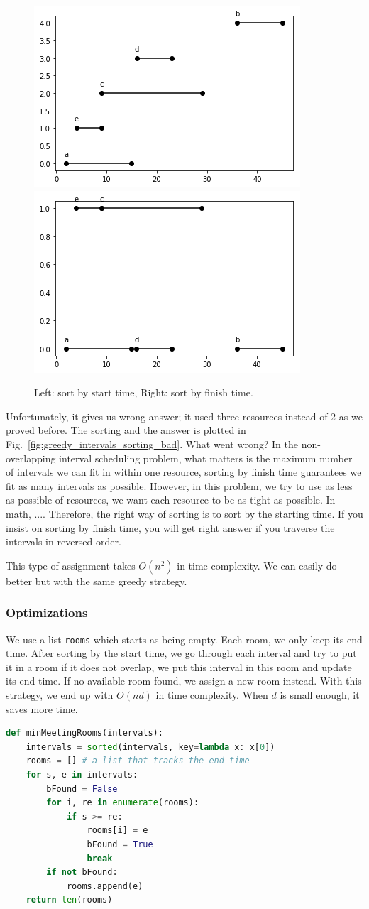 \documentclass[../main.tex]{subfiles}
\begin{document}
\begin{figure}[H]
    \centering
    \includegraphics[width=0.48\columnwidth]{fig/greedy_schedule_all_intervals_sorting.png}
        \includegraphics[width=0.48\columnwidth]{fig/greedy_schedule_all_intervals_good_sort.png}
    \caption{Left: sort by start time, Right: sort by finish time.}
    \label{fig:greedy_intervals_sorting_good}
\end{figure}
Unfortunately, it gives us wrong answer; it used three resources instead of 2 as we proved before. The sorting and the answer is plotted in  Fig.~\ref{fig:greedy_intervals_sorting_bad}. What went wrong? In the non-overlapping interval scheduling problem, what matters is the maximum number of intervals we can fit in within one resource, sorting by finish time guarantees we fit as many intervals as possible. However, in this problem, we try to use as less as possible of resources, we want each resource to be as tight as possible. In math, .... Therefore, the right way of sorting is to sort by the starting time. If you insist on sorting by finish time, you will get right answer if you traverse the intervals in reversed order.  

This type of assignment takes $O(n^2)$ in time complexity. We can easily do better but with the same greedy strategy. 
\subsubsection{Optimizations} 
We use a list \texttt{rooms} which starts as being empty.  Each room, we only keep its end time. After sorting by the start time, we go through each interval and try to put it in a room if it does not overlap, we put this interval in this room and update its end time. If no available room found, we assign a new room instead. With this strategy, we end up with $O(nd)$ in time complexity. When $d$ is small enough, it saves more time. 
\begin{lstlisting}[language=Python]
def minMeetingRooms(intervals):
    intervals = sorted(intervals, key=lambda x: x[0])
    rooms = [] # a list that tracks the end time
    for s, e in intervals:
        bFound = False
        for i, re in enumerate(rooms):
            if s >= re:
                rooms[i] = e
                bFound = True
                break
        if not bFound:
            rooms.append(e)
    return len(rooms)
\end{lstlisting}
\end{document}
